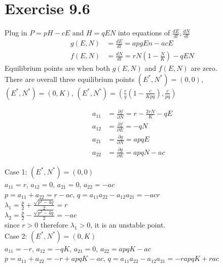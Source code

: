 \documentclass[11pt,letterpaper]{article}
\begin{document}
\section*{Exercise 9.6}
\noindent Plug in $P = pH - cE$ and $H = qEN$ into equations of $\frac{dE}{dt}, \frac{dN}{dt}$
\begin{align*}
g(E, N) &= \frac{dE}{dt} = apgEn - acE \\
f(E, N) &= \frac{dN}{dt} = rN(1 - \frac{N}{K}) - q EN
\end{align*}
\noindent Equilibrium points are when both $g(E, N)$ and $f(E, N)$ are zero. \\

\noindent There are overall three equilibrium points $(E^*, N^*) = (0, 0)$, $(E^*, N^*) = (0, K)$, $(E^*, N^*) = (\frac{r}{q} (1 - \frac{c}{Kpq}), \frac{c}{pq})$

\begin{align*}
a_{11} &= \frac{\partial f}{\partial N} = r - \frac{2rN}{K} - qE \\
a_{12} &= \frac{\partial f}{\partial E} = - qN \\
a_{21} &= \frac{\partial g}{\partial N} = a p q E \\
a_{22} &= \frac{\partial g}{\partial E} = apqN - ac
\end{align*}

\noindent Case 1: $(E^*, N^*) = (0, 0)$ \\

$a_{11} = r $, $a_{12} = 0$, $a_{21} = 0$, $a_{22} = -ac$ \\

$p = a_{11} + a_{22} = r - ac$, $q = a_{11}a_{22} - a_{12} a_{21} = -acr$ \\

$\lambda_1 = \frac{p}{2} + \frac{\sqrt{p^2 - 4q}}{2}  = r$ \\

$\lambda_2 = \frac{p	}{2} - \frac{\sqrt{p^2 - 4q}}{2} = -ac$ \\

\noindent since $r > 0$ therefore $\lambda_1 > 0$, it is an unstable point. \\

\noindent Case 2: $(E^*, N^*) = (0, K)$ \\

$a_{11} = -r $, $a_{12} = -qK$, $a_{21} = 0$, $a_{22} = apqK - ac$ \\

$p = a_{11} + a_{22} = -r + apqK - ac$, $q = a_{11}a_{22} - a_{12} a_{21} = -rapqK + rac$ \\
\end{document}
